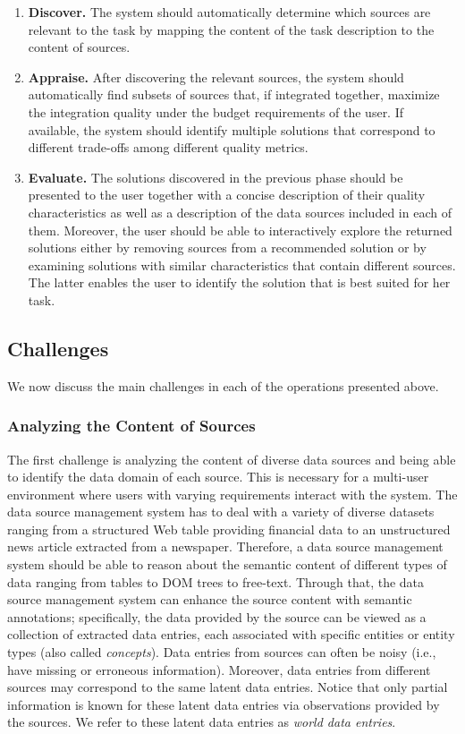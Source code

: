 \documentclass{sig-alternate}
\begin{document}
\begin{enumerate}
\vspace{-5pt}\item {\bf Discover.} The system should automatically determine which sources are relevant to the task by mapping the content of the task description to the content of sources.
\vspace{-5pt}\item {\bf Appraise.} After discovering the relevant sources, the system should automatically find subsets of sources that, if integrated together, maximize the integration quality under the budget requirements of the user. If available, the system should identify multiple solutions that correspond to different trade-offs among different quality metrics. 
\vspace{-5pt}\item {\bf Evaluate.} The solutions discovered in the previous phase should be presented to the user together with a concise description of their quality characteristics as well as a description of the data sources included in each of them. Moreover, the user should be able to interactively explore the returned solutions either by removing sources from a recommended solution or by examining solutions with similar characteristics that contain different sources. The latter enables the user to identify the solution that is best suited for her task.
\end{enumerate}

\subsection{Challenges}
We now discuss the main challenges in each of the operations presented above. 
\subsubsection{Analyzing the Content of Sources}
\label{sec:content}
The first challenge is analyzing the content of diverse data sources and being able to identify the data domain of each source. This is necessary for a multi-user environment where users with varying requirements interact with the system. The data source management system has to deal with a variety of diverse datasets ranging from a structured Web table providing financial data to an unstructured news article extracted from a newspaper. Therefore, a data source management system should be able to reason about the semantic content of different types of data ranging from tables to DOM trees to free-text. Through that, the data source management system can enhance the source content with semantic annotations; specifically, the data provided by the source can be viewed as a collection of extracted data entries, each associated with specific entities or entity types (also called {\em concepts}). Data entries from sources can often be noisy (i.e., have missing or erroneous information). Moreover, data entries from different sources may correspond to the same latent data entries. Notice that only partial information is known for these latent data entries via observations provided by the sources.  We refer to these latent data entries as {\em world data entries}.
\end{document}
